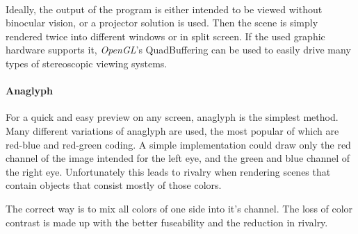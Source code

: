 \paragraph{}
Ideally, the output of the program is either intended to be viewed without binocular vision, or a projector solution is used.
Then the scene is simply rendered twice into different windows or in split screen.
If the used graphic hardware supports it, \textit{OpenGL}'s QuadBuffering can be used to easily drive many types of stereoscopic viewing systems.

\paragraph{Anaglyph}
For a quick and easy preview on any screen, anaglyph is the simplest method.
Many different variations of anaglyph are used, the most popular of which are red-blue and red-green coding.
A simple implementation could draw only the red channel of the image intended for the left eye, and the green and blue channel of the right eye.
Unfortunately this leads to rivalry when rendering scenes that contain objects that consist mostly of those colors.

The correct way is to mix all colors of one side into it's channel.
The loss of color contrast is made up with the better fuseability and the reduction in rivalry.


